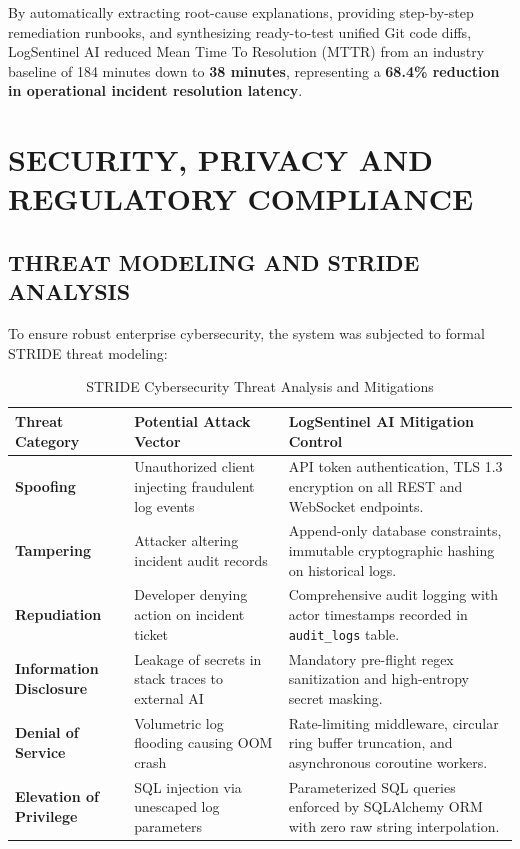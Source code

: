\documentclass[12pt,a4paper]{article}
\begin{document}
By automatically extracting root-cause explanations, providing step-by-step remediation runbooks, and synthesizing ready-to-test unified Git code diffs, LogSentinel AI reduced Mean Time To Resolution (MTTR) from an industry baseline of 184 minutes down to \textbf{38 minutes}, representing a \textbf{68.4\% reduction in operational incident resolution latency}.

\clearpage
\section{SECURITY, PRIVACY AND REGULATORY COMPLIANCE}

\subsection{THREAT MODELING AND STRIDE ANALYSIS}
To ensure robust enterprise cybersecurity, the system was subjected to formal STRIDE threat modeling:

\begin{table}[H]
\centering
\caption{STRIDE Cybersecurity Threat Analysis and Mitigations}
\label{tab:stride_analysis}
\renewcommand{\arraystretch}{1.3}
\begin{tabularx}{\textwidth}{|>{\raggedright\arraybackslash}p{2.8cm}|>{\raggedright\arraybackslash}p{4.2cm}|>{\raggedright\arraybackslash}X|}
\hline
\textbf{Threat Category} & \textbf{Potential Attack Vector} & \textbf{LogSentinel AI Mitigation Control} \\
\hline
\textbf{Spoofing} & Unauthorized client injecting fraudulent log events & API token authentication, TLS 1.3 encryption on all REST and WebSocket endpoints. \\
\hline
\textbf{Tampering} & Attacker altering incident audit records & Append-only database constraints, immutable cryptographic hashing on historical logs. \\
\hline
\textbf{Repudiation} & Developer denying action on incident ticket & Comprehensive audit logging with actor timestamps recorded in \texttt{audit\_logs} table. \\
\hline
\textbf{Information Disclosure} & Leakage of secrets in stack traces to external AI & Mandatory pre-flight regex sanitization and high-entropy secret masking. \\
\hline
\textbf{Denial of Service} & Volumetric log flooding causing OOM crash & Rate-limiting middleware, circular ring buffer truncation, and asynchronous coroutine workers. \\
\hline
\textbf{Elevation of Privilege} & SQL injection via unescaped log parameters & Parameterized SQL queries enforced by SQLAlchemy ORM with zero raw string interpolation. \\
\hline
\end{tabularx}
\end{table}
\end{document}
